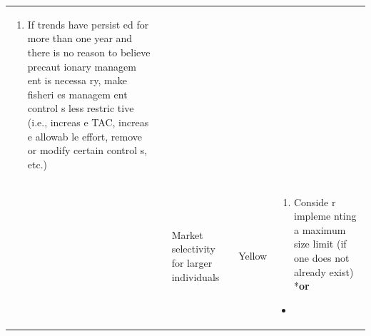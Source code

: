 \documentclass[]{book}
\providecommand{\tightlist}{%
  \setlength{\itemsep}{0pt}\setlength{\parskip}{0pt}}
\begin{document}
\begin{longtable}[]{@{}lllll@{}}
\begin{minipage}[t]{0.19\columnwidth}
\begin{enumerate}
\def\labelenumi{\arabic{enumi}.}
\tightlist
\item
  If trends have persist ed for more than one year and there is no
  reason to believe precaut ionary managem ent is necessa ry, make
  fisheri es managem ent control s less restric tive (i.e., increas e
  TAC, increas e allowab le effort, remove or modify certain control s,
  etc.)
\end{enumerate}\strut
\end{minipage}\tabularnewline
\begin{minipage}[t]{0.19\columnwidth}\raggedright\strut
\strut
\end{minipage} & \begin{minipage}[t]{0.19\columnwidth}\raggedright\strut
\strut
\end{minipage} & \begin{minipage}[t]{0.19\columnwidth}\raggedright\strut
Market selectivity for larger individuals\strut
\end{minipage} & \begin{minipage}[t]{0.19\columnwidth}\raggedright\strut
Yellow\strut
\end{minipage} & \begin{minipage}[t]{0.19\columnwidth}\raggedright\strut
\begin{enumerate}
\def\labelenumi{\arabic{enumi}.}
\tightlist
\item
  Conside r impleme nting a maximum size limit (if one does not already
  exist) *\textbf{or}
\end{enumerate}

\begin{itemize}
\item
\end{itemize}


\end{minipage}
\end{longtable}
\end{document}
